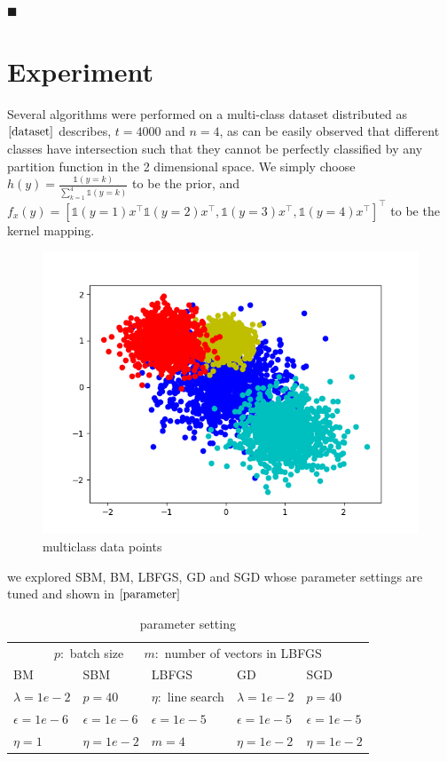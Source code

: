 \documentclass{article}
\begin{document}
\hfill$\blacksquare$
  

\section{Experiment}

 Several algorithms were performed on a multi-class dataset distributed as $\ref{dataset}$ describes, $t = 4000$ and $n = 4$, as can be easily observed that
 different classes have intersection such that they cannot be perfectly classified by any partition function in the 2 dimensional space.
We simply choose $h(y) = \frac{\mathds{1}(y = k)}{\sum_{k=1}^{4} \mathds{1}(y = k)}$ to be the prior, and $f_{x}(y) = [ \mathds{1}(y = 1) x^{\top}\mathds{1}(y = 2) x^{\top}, \mathds{1}(y = 3) x^{\top}, \mathds{1}(y = 4) x^{\top}  ]^{\top}$
to be the kernel mapping. 

\begin{figure}[htbp]
  \centering
  \includegraphics[width = .7\textwidth]{multi4.png}
  \caption{multiclass data points}
  \label{dataset}
\end{figure}

we explored SBM, BM, LBFGS, GD and SGD whose parameter settings are tuned and shown in $\ref{parameter}$

\begin{table}[htbp]
  \caption{parameter setting}
  \label{parameter}
  \centering
  \begin{tabular}{lllll}
    \toprule
    \multicolumn{5}{c}{$p:$ batch size $\quad$  $m:$ number of vectors in LBFGS }                   \\
    \cmidrule(r){1-5}
    BM     & SBM    & LBFGS & GD & SGD \\
    \midrule
    $\lambda = 1e-2$ &  $p = 40$  & $\eta:$ line search &$\lambda = 1e-2$ &$p = 40$      \\
     $\epsilon = 1e-6$    &  $\epsilon = 1e-6$  &  $\epsilon = 1e-5$ & $\epsilon = 1e-5$& $\epsilon = 1e-5$ \\
    $ \eta = 1$   &  $ \eta = 1e-2$   &  $m = 4$ &$\eta = 1e-2$ &$\eta = 1e-2$  \\
    \bottomrule
  \end{tabular}
\end{table}
\end{document}
